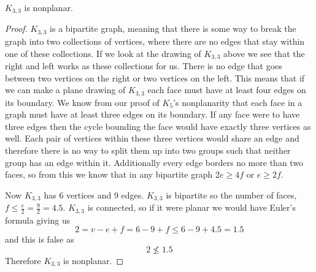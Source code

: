 \documentclass{article}
\begin{document}
\begin{theorem}
	$K_{3,3}$ is nonplanar.
\end{theorem}
\begin{center}
		
\end{center}
\begin{proof}
	$K_{3,3}$ is a bipartite graph, meaning that there is some way to break the graph into two collections of vertices, where there are no edges that stay within one of these collections. If we look at the drawing of $K_{3,3}$ above we see that the right and left works as these collections for us. There is no edge that goes between two vertices on the right or two vertices on the left. This means that if we can make a plane drawing of $K_{3,3}$ each face must have at least four edges on its boundary. We know from our proof of $K_5$'s nonplanarity that each face in a graph must have at least three edges on its boundary. If any face were to have three edges then the cycle bounding the face would have exactly three vertices as well. Each pair of vertices within these three vertices would share an edge and therefore there is no way to split them up into two groups such that neither group has an edge within it. Additionally every edge borders no more than two faces, so from this we know that in any bipartite graph $2e \ge 4f$ or $e\ge 2f$.
	
	Now $K_{3,3}$ has 6 vertices and 9 edges. $K_{3,3}$ is bipartite so the number of faces, $f \le \frac e2 = \frac92 = 4.5$. $K_{3,3}$ is connected, so if it were planar we would have Euler's formula giving us $$2=v-e+f=6-9+f\le6-9+4.5=1.5$$ and this is false as $$2\not\le1.5$$ Therefore $K_{3,3}$ is nonplanar.
\end{proof}
\end{document}
